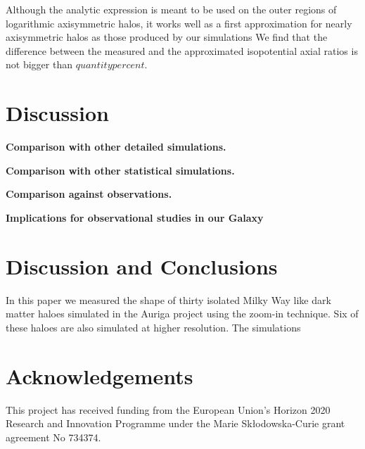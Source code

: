 \documentclass[a4paper,fleqn,usenatbib]{mnras}
\begin{document}
Although the analytic expression is meant to be used on the outer
regions of logarithmic axisymmetric halos, it works well as a first
approximation for nearly axisymmetric halos as those produced by our
simulations 
We find that the difference between the measured and the
approximated isopotential axial ratios is not bigger than $quantity
percent$.

\section{Discussion}

{\bf Comparison with other detailed simulations.}

{\bf Comparison with other statistical simulations.}

{\bf Comparison against observations.}

{\bf Implications for observational studies in our Galaxy}

\section{Discussion and Conclusions}

In this paper we measured the shape of thirty isolated Milky Way like 
dark matter haloes simulated in the Auriga project using the zoom-in
technique. 
Six of these haloes are also simulated at higher resolution.
The simulations

\section*{Acknowledgements}
This project has received funding from the European Union's Horizon
2020 Research and Innovation Programme under the Marie
Sk\l{}odowska-Curie grant agreement No 734374. 

 
 
\end{document}
